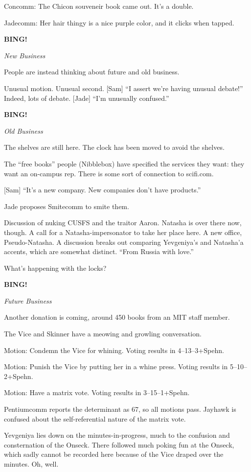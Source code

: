 \documentclass[12pt]{article}
\newcommand{\bing}{{\bf BING!} }
\newcommand{\goto}[1]{\bing \vskip 12pt \centerline{{\em{#1}}}}
\begin{document}
Concomm: The Chicon souveneir book came out.  It's a double.

Jadecomm: Her hair thingy is a nice purple color, and it clicks
when tapped.

\goto{New Business}

People are instead thinking about future and old business.

Unusual motion.  Unusual second.  [Sam] ``I assert we're having
unusual debate!''  Indeed, lots of debate.  [Jade] ``I'm unusually
confused.''

\goto{Old Business}

The shelves are still here.  The clock has been moved to avoid the
shelves.

The ``free books'' people (Nibblebox) have specified the services
they want: they want an on-campus rep.  There is some sort of
connection to scifi.com.

[Sam] ``It's a new company.  New companies don't have products.''

Jade proposes Smitecomm to smite them.

Discussion of nuking CUSFS and the traitor Aaron.  Natasha is over
there now, though.  A call for a Natasha-impersonator to take her
place here.  A new office, Pseudo-Natasha.  A discussion breaks out
comparing Yevgeniya's and Natasha'a accents, which are somewhat
distinct.  ``From Russia with love.''

What's happening with the locks?

\goto{Future Business}

Another donation is coming, around 450 books from an MIT staff
member.

The Vice and Skinner have a meowing and growling conversation.

Motion: Condemn the Vice for whining.  Voting results in 4--13--3+Spehn.

Motion: Punish the Vice by putting her in a whine press.  Voting results
in 5--10--2+Spehn.

Motion: Have a matrix vote.  Voting results in 3--15--1+Spehn.

Pentiumcomm reports the determinant as 67, so all motions pass.
Jayhawk is confused about the self-referential nature of the matrix
vote.

Yevgeniya lies down on the minutes-in-progress, much to the confusion
and consternation of the Onseck.  There followed much poking fun at
the Onseck, which sadly cannot be recorded here because of the Vice
draped over the minutes.  Oh, well.
\end{document}
